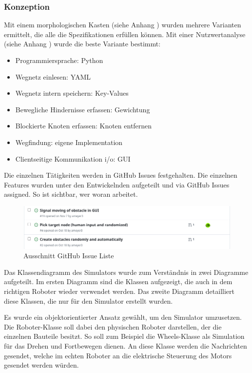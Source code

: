 \subsubsection{Konzeption}

Mit einem morphologischen Kasten (siehe Anhang ) wurden mehrere Varianten ermittelt, die alle die Spezifikationen erfüllen können. Mit einer Nutzwertanalyse (siehe Anhang ) wurde die beste Variante bestimmt:

\begin{itemize}
    \item Programmiersprache: Python
    \item Wegnetz einlesen: YAML
    \item Wegnetz intern speichern: Key-Values
    \item Bewegliche Hindernisse erfassen: Gewichtung
    \item Blockierte Knoten erfassen: Knoten entfernen
    \item Wegfindung: eigene Implementation
    \item Clientseitige Kommunikation \acrshort{i/o}: GUI
\end{itemize}

Die einzelnen Tätigkeiten werden in GitHub Issues festgehalten. Die einzelnen Features wurden unter den Entwickelnden aufgeteilt und via GitHub Issues assigned. So ist sichtbar, wer woran arbeitet.

\begin{figure}[H]
\centering
\includegraphics[width=\textwidth]{img/github-issues.png}
\caption{Ausschnitt GitHub Issue Liste}
\label{fig:github-issues}
\end{figure}

Das Klassendiagramm des Simulators wurde zum Verständnis in zwei Diagramme aufgeteilt. Im ersten Diagramm sind die Klassen aufgezeigt, die auch in dem richtigen Roboter wieder verwendet werden. Das zweite Diagramm detailliert diese Klassen, die nur für den Simulator erstellt wurden.

Es wurde ein objektorientierter Ansatz gewählt, um den Simulator umzusetzen. Die Roboter-Klasse soll dabei den physischen Roboter darstellen, der die einzelnen Bauteile besitzt. So soll zum Beispiel die Wheels-Klasse als Simulation für das Drehen und Fortbewegen dienen. An diese Klasse werden die Nachrichten gesendet, welche im echten Roboter an die elektrische Steuerung des Motors gesendet werden würden.

